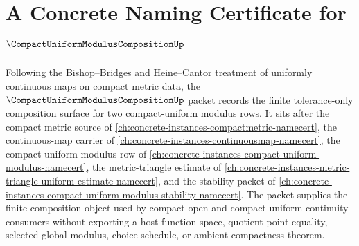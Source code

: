 \chapter{A Concrete Naming Certificate for $\CompactUniformModulusCompositionUp$}
\label{ch:concrete-instances-compact-uniform-modulus-composition-namecert}

Following the Bishop--Bridges and Heine--Cantor treatment of uniformly continuous maps on compact metric data, the $\CompactUniformModulusCompositionUp$ packet records the finite tolerance-only composition surface for two compact-uniform modulus rows. It sits after the compact metric source of \autoref{ch:concrete-instances-compactmetric-namecert}, the continuous-map carrier of \autoref{ch:concrete-instances-continuousmap-namecert}, the compact uniform modulus row of \autoref{ch:concrete-instances-compact-uniform-modulus-namecert}, the metric-triangle estimate of \autoref{ch:concrete-instances-metric-triangle-uniform-estimate-namecert}, and the stability packet of \autoref{ch:concrete-instances-compact-uniform-modulus-stability-namecert}. The packet supplies the finite composition object used by compact-open and compact-uniform-continuity consumers without exporting a host function space, quotient point equality, selected global modulus, choice schedule, or ambient compactness theorem.

